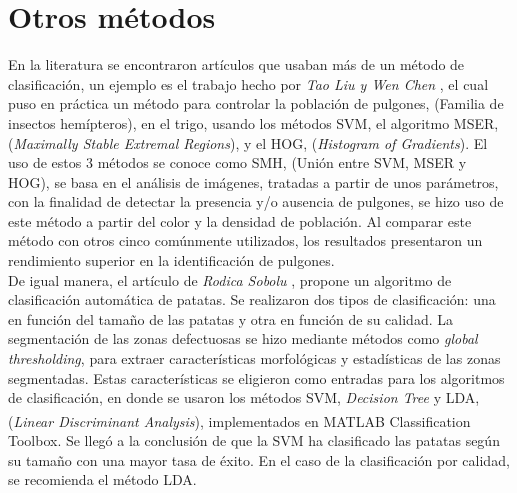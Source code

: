 \section{Otros métodos}
En la literatura se encontraron artículos que usaban más de un método de clasificación, un ejemplo es el trabajo hecho por \textit{Tao Liu y Wen Chen} \cite{LIU201682}, el cual puso en práctica un método para controlar la población de pulgones, (Familia de insectos hemípteros), en el trigo, usando los métodos SVM, el algoritmo MSER, (\textit{Maximally Stable Extremal Regions}), y el HOG, (\textit{Histogram of Gradients}). El uso de estos 3 métodos se conoce como SMH, (Unión entre SVM, MSER y HOG), se basa en el análisis de imágenes, tratadas a partir de unos parámetros, con la finalidad de detectar la presencia y/o ausencia de pulgones, se hizo uso de este método a partir del color y la densidad de población. Al comparar este método con otros cinco comúnmente utilizados, los resultados presentaron un rendimiento superior en la identificación de pulgones. \\

De igual manera, el artículo de \textit{Rodica Sobolu} \cite{sobolu2020automatic}, propone un algoritmo de clasificación automática de patatas. Se realizaron dos tipos de clasificación: una en función del tamaño de las patatas y otra en función de su calidad. La segmentación de las zonas defectuosas se hizo mediante métodos como \textit{global thresholding}, para extraer características morfológicas y estadísticas de las zonas segmentadas. Estas características se eligieron como entradas para los algoritmos de clasificación, en donde se usaron los métodos SVM, \textit{Decision  Tree} y LDA, (\textit{Linear Discriminant Analysis}), implementados en MATLAB\textsuperscript{\textregistered} Classification Toolbox. Se llegó a la conclusión de que la SVM ha clasificado las patatas según su tamaño con una mayor tasa de éxito. En el caso de la clasificación por calidad, se recomienda el método LDA.\\


